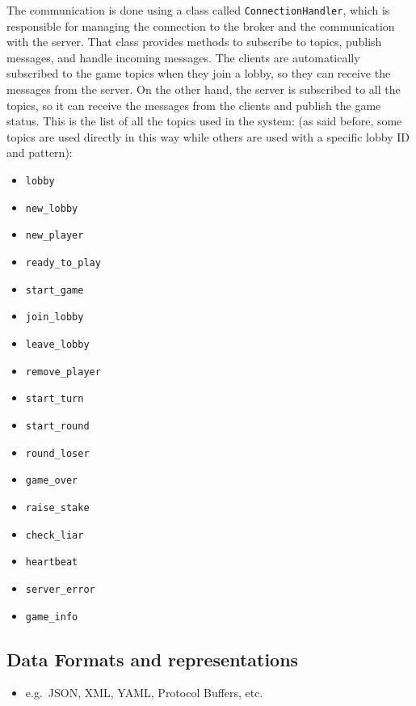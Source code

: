 \documentclass{scrartcl}
\begin{document}
The communication is done using a class called \texttt{ConnectionHandler}, which is responsible for managing the connection to the broker and the communication with the server. That class provides methods to subscribe to topics, publish messages, and handle incoming messages. \newline
The clients are automatically subscribed to the game topics when they join a lobby, so they can receive the messages from the server. On the other hand, the server is subscribed to all the topics, so it can receive the messages from the clients and publish the game status. \newline
This is the list of all the topics used in the system: (as said before, some topics are used directly in this way while others are used with a specific lobby ID and pattern):
\begin{itemize}
    \item \texttt{lobby}
    \item \texttt{new\_lobby}
    \item \texttt{new\_player}
    \item \texttt{ready\_to\_play}
    \item \texttt{start\_game}
    \item \texttt{join\_lobby}
    \item \texttt{leave\_lobby}
    \item \texttt{remove\_player}
    \item \texttt{start\_turn}
    \item \texttt{start\_round}
    \item \texttt{round\_loser}
    \item \texttt{game\_over}
    \item \texttt{raise\_stake}
    \item \texttt{check\_liar}
    \item \texttt{heartbeat}
    \item \texttt{server\_error}
    \item \texttt{game\_info}
\end{itemize}
\subsection{Data Formats and representations}\label{data-formats}

\begin{itemize}
    \item e.g.~JSON, XML, YAML, Protocol Buffers, etc.
\end{itemize}
\end{document}
